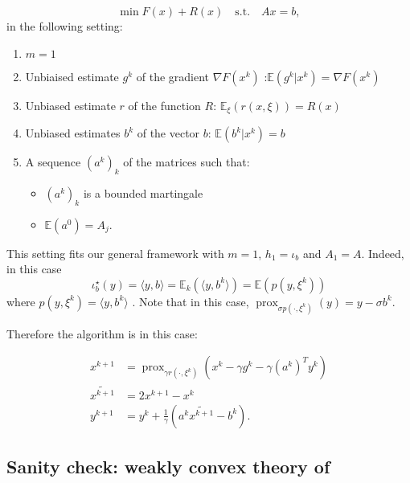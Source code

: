 \documentclass{article}
\newcommand{\asnote}[1]{\todo[color=green!]{#1}}
\DeclareMathOperator{\prox}{prox}
\newcommand{\bE}{{\mathbb E}}
\newcommand{\ps}[1]{\langle #1 \rangle}
\theoremstyle{definition}
\begin{document}
\begin{equation}
    \label{eq:sto-lin-cons}
    \min F(x) + R(x) \quad \text{s.t.} \quad Ax = b,
\end{equation}
 in the following setting:
 \begin{enumerate}
    \item $m=1$
    \item Unbiaised estimate $g^{k}$ of the gradient $\nabla F(x^k)$ :$\bE(g^k|x^k) = \nabla F(x^k)$
    \item Unbiased estimate $r$ of the function $R$: $\bE_\xi(r(x,\xi)) = R(x)$ 
    \item Unbiased estimates $b^k$ of the vector $b$: $\bE(b^k|x^k) = b$
    \item A sequence $(a^k)_k$ of the matrices such that: \begin{itemize}
                                                                                        \item $(a^k)_k$ is a bounded martingale
                                                                                        \item $\bE(a^0) = A_j$.
    \end{itemize}
\end{enumerate}  

This setting fits our general framework with $m=1$, $h_1 = \iota_b$ and $A_1 = A$. Indeed, in this case
\begin{equation}
    \iota_b^\star(y) = \ps{y,b} = \bE_k(\ps{y,b^k}) = \bE(p(y,\xi^k))
\end{equation}
where $p(y,\xi^k) = \ps{y,b^k}$ \asnote{not clear}.
Note that in this case, $\prox_{\sigma p(\cdot,\xi^k)}(y) = y - \sigma b^k$.

Therefore the algorithm is in this case:

\begin{align}
    \label{eq:algo-general}
    x^{k+1}   &= \prox_{\gamma r(\cdot,\xi^{k})}(x^k - \gamma g^{k} - \gamma (a^{k})^{T} y^k)\\
    \widetilde{x^{k+1}} &= 2x^{k+1} - x^k\\
    y^{k+1} &= y^k + \frac{1}{\gamma} (a^k \widetilde{x^{k+1}} - b^k).
\end{align}

\subsection{Sanity check: weakly convex theory of~\cite{gorbunov2019unified}}
\end{document}
